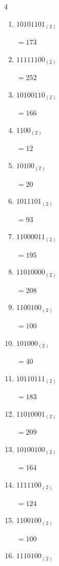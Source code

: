 \begin{multicols}{4}
\begin{enumerate}
        $=98$

  \item $10101101_{(2)}$

        $=173$

  \item $11111100_{(2)}$

        $=252$

  \item $10100110_{(2)}$

        $=166$

  \item $1100_{(2)}$

        $=12$

  \item $10100_{(2)}$

        $=20$

  \item $1011101_{(2)}$

        $=93$

\columnbreak %

  \item $11000011_{(2)}$

        $=195$

  \item $11010000_{(2)}$

        $=208$

  \item $1100100_{(2)}$

        $=100$

  \item $101000_{(2)}$

        $=40$

  \item $10110111_{(2)}$

        $=183$

  \item $11010001_{(2)}$

        $=209$

  \item $10100100_{(2)}$

        $=164$

  \item $1111100_{(2)}$

        $=124$

  \item $1100100_{(2)}$

        $=100$

  \item $1110100_{(2)}$


\end{enumerate}
\end{multicols}
